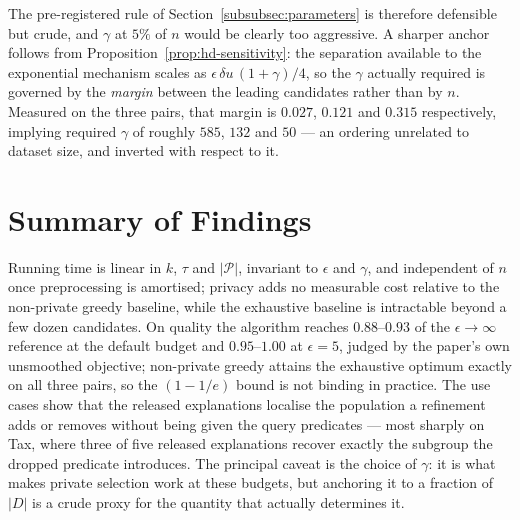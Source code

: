 The pre-registered rule of Section~\ref{subsubsec:parameters} is therefore defensible but crude, and $\gamma$ at $5\%$ of $n$ would be clearly too aggressive.
A sharper anchor follows from Proposition~\ref{prop:hd-sensitivity}: the separation available to the exponential mechanism scales as $\epsilon\,\delta u\,(1+\gamma)/4$, so the $\gamma$ actually required is governed by the \emph{margin} between the leading candidates rather than by $n$.
Measured on the three pairs, that margin is $0.027$, $0.121$ and $0.315$ respectively, implying required $\gamma$ of roughly $585$, $132$ and $50$ --- an ordering unrelated to dataset size, and inverted with respect to it.

\section{Summary of Findings}
\label{subsec:experiments-summary}

Running time is linear in $k$, $\tau$ and $|\mathcal{P}|$, invariant to $\epsilon$ and $\gamma$, and independent of $n$ once preprocessing is amortised; privacy adds no measurable cost relative to the non-private greedy baseline, while the exhaustive baseline is intractable beyond a few dozen candidates.
On quality the algorithm reaches $0.88$--$0.93$ of the $\epsilon\rightarrow\infty$ reference at the default budget and $0.95$--$1.00$ at $\epsilon=5$, judged by the paper's own unsmoothed objective; non-private greedy attains the exhaustive optimum exactly on all three pairs, so the $(1-1/e)$ bound is not binding in practice.
The use cases show that the released explanations localise the population a refinement adds or removes without being given the query predicates --- most sharply on Tax, where three of five released explanations recover exactly the subgroup the dropped predicate introduces.
The principal caveat is the choice of $\gamma$: it is what makes private selection work at these budgets, but anchoring it to a fraction of $|D|$ is a crude proxy for the quantity that actually determines it.
